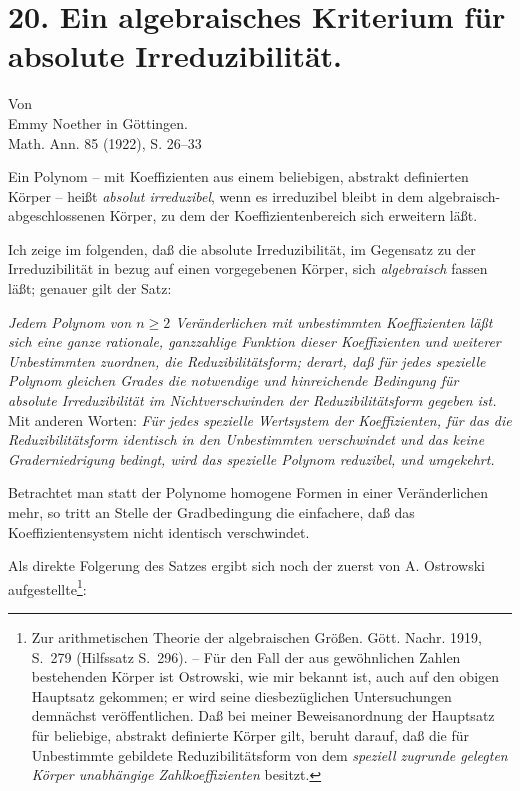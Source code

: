 \section*{20. Ein algebraisches Kriterium für absolute Irreduzibilität.}
\begin{center}
Von\\[0.25em]
Emmy Noether in Göttingen.\\[0.6em]
Math. Ann. 85 (1922), S. 26--33
\end{center}

Ein Polynom -- mit Koeffizienten aus einem beliebigen, abstrakt definierten Körper -- heißt \emph{absolut irreduzibel}, wenn es irreduzibel bleibt in dem algebraisch-abgeschlossenen Körper, zu dem der Koeffizientenbereich sich erweitern läßt.\addtocounter{footnote}{1} Ich zeige im folgenden, daß die absolute Irreduzibilität, im Gegensatz zu der Irreduzibilität in bezug auf einen vorgegebenen Körper, sich \emph{algebraisch} fassen läßt; genauer gilt der Satz:

\emph{Jedem Polynom von $n\ge2$ Veränderlichen mit unbestimmten Koeffizienten läßt sich eine ganze rationale, ganzzahlige Funktion dieser Koeffizienten und weiterer Unbestimmten zuordnen, die Reduzibilitätsform; derart, daß für jedes spezielle Polynom gleichen Grades die notwendige und hinreichende Bedingung für absolute Irreduzibilität im Nichtverschwinden der Reduzibilitätsform gegeben ist.} Mit anderen Worten: \emph{Für jedes spezielle Wertsystem der Koeffizienten, für das die Reduzibilitätsform identisch in den Unbestimmten verschwindet und das keine Graderniedrigung bedingt, wird das spezielle Polynom reduzibel, und umgekehrt.}

Betrachtet man statt der Polynome homogene Formen in einer Veränderlichen mehr, so tritt an Stelle der Gradbedingung die einfachere, daß das Koeffizientensystem nicht identisch verschwindet.

Als direkte Folgerung des Satzes ergibt sich noch der zuerst von A. Ostrowski aufgestellte\footnote{Zur arithmetischen Theorie der algebraischen Größen. Gött. Nachr. 1919, S.~279 (Hilfssatz S.~296). -- Für den Fall der aus gewöhnlichen Zahlen bestehenden Körper ist Ostrowski, wie mir bekannt ist, auch auf den obigen Hauptsatz gekommen; er wird seine diesbezüglichen Untersuchungen demnächst veröffentlichen. Daß bei meiner Beweisanordnung der Hauptsatz für beliebige, abstrakt definierte Körper gilt, beruht darauf, daß die für Unbestimmte gebildete Reduzibilitätsform von dem \emph{speziell zugrunde gelegten Körper unabhängige Zahlkoeffizienten} besitzt.}:

